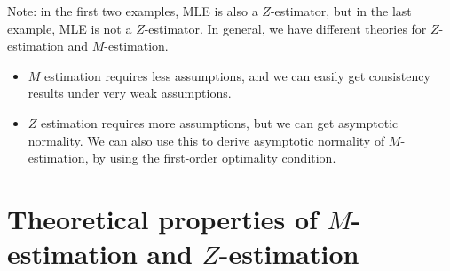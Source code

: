 \documentclass[11pt,letterpaper]{article}
\numberwithin{assumption}{lecture}
\numberwithin{theorem}{lecture}
\numberwithin{proposition}{lecture}
\numberwithin{lemma}{lecture}
\numberwithin{claim}{lecture}
\numberwithin{corollary}{lecture}
\numberwithin{definition}{lecture}
\numberwithin{conjecture}{lecture}
\numberwithin{remark}{lecture}
\numberwithin{example}{lecture}
\numberwithin{equation}{lecture}
\begin{document}
Note: in the first two examples, MLE is also a $Z$-estimator, but in the last example, MLE is not a $Z$-estimator. In general, we have different theories for $Z$-estimation and $M$-estimation.
\begin{itemize}
  \item $M$ estimation requires less assumptions, and we can easily get consistency results under very weak assumptions.
  \item $Z$ estimation requires more assumptions, but we can get asymptotic normality. We can also use this to derive asymptotic normality of $M$-estimation, by using the first-order optimality condition.
\end{itemize}
\section{Theoretical properties of $M$-estimation and $Z$-estimation}
\end{document}
